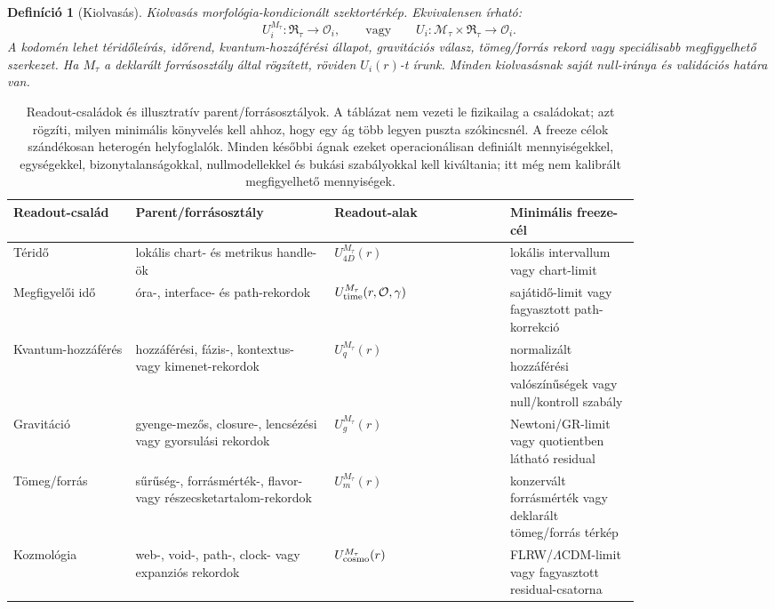 \documentclass[12pt]{article}
\newtheorem{definition}{Definíció}
\newcommand{\RTspace}{\mathfrak R_{\tau}}
\newcommand{\Mta}{M_{\tau}}
\newcommand{\Obs}{\mathcal O}
\begin{document}
\begin{definition}[Kiolvasás]
Kiolvasás morfológia-kondicionált szektortérkép.  Ekvivalensen írható:
\[
  U_i^{\Mta}:\RTspace\to\Obs_i,
  \qquad\text{vagy}\qquad
  U_i:\mathcal M_\tau\times\RTspace\to\Obs_i.
\]
A kodomén lehet téridőleírás, időrend, kvantum-hozzáférési állapot,
gravitációs válasz, tömeg/forrás rekord vagy speciálisabb megfigyelhető
szerkezet.  Ha \(\Mta\) a deklarált forrásosztály által rögzített, röviden
\(U_i(r)\)-t írunk.  Minden kiolvasásnak saját null-iránya és validációs
határa van.
\end{definition}

\begin{table}[H]
\centering
\scriptsize
\begin{tabular}{L{0.16\linewidth}L{0.26\linewidth}L{0.23\linewidth}L{0.17\linewidth}}
\toprule
Readout-család & Parent/forrásosztály & Readout-alak & Minimális freeze-cél\\
\midrule
Téridő & lokális chart- és metrikus handle-ök & \(U_{4D}^{\Mta}(r)\) &
lokális intervallum vagy chart-limit\\
Megfigyelői idő & óra-, interface- és path-rekordok &
\(U_{\rm time}^{\Mta}(r,\mathcal O,\gamma)\) &
sajátidő-limit vagy fagyasztott path-korrekció\\
Kvantum-hozzáférés & hozzáférési, fázis-, kontextus- vagy kimenet-rekordok &
\(U_q^{\Mta}(r)\) &
normalizált hozzáférési valószínűségek vagy null/kontroll szabály\\
Gravitáció & gyenge-mezős, closure-, lencsézési vagy gyorsulási rekordok &
\(U_g^{\Mta}(r)\) &
Newtoni/GR-limit vagy quotientben látható residual\\
Tömeg/forrás & sűrűség-, forrásmérték-, flavor- vagy részecsketartalom-rekordok &
\(U_m^{\Mta}(r)\) &
konzervált forrásmérték vagy deklarált tömeg/forrás térkép\\
Kozmológia & web-, void-, path-, clock- vagy expanziós rekordok &
\(U_{\rm cosmo}^{\Mta}(r)\) &
FLRW/\(\Lambda\)CDM-limit vagy fagyasztott residual-csatorna\\
\bottomrule
\end{tabular}
\caption{Readout-családok és illusztratív parent/forrásosztályok.  A táblázat
nem vezeti le fizikailag a családokat; azt rögzíti, milyen minimális
könyvelés kell ahhoz, hogy egy ág több legyen puszta szókincsnél.  A freeze
célok szándékosan heterogén helyfoglalók.  Minden későbbi ágnak ezeket
operacionálisan definiált mennyiségekkel, egységekkel, bizonytalanságokkal,
nullmodellekkel és bukási szabályokkal kell kiváltania; itt még nem kalibrált
megfigyelhető mennyiségek.}
\label{tab:readout-families-hu}
\end{table}
\end{document}
